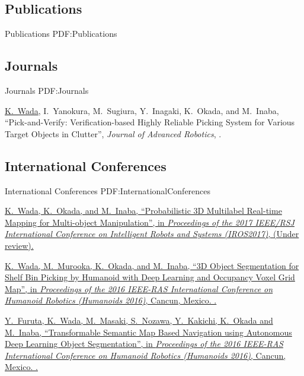\documentclass[letterpaper,MMMyyyy,nonstop]{simpleresumecv}
\begin{document}
\begin{body}

\section
{Publications}
{Publications}
{PDF:Publications}

\subsection
{Journals}
{Journals}
{PDF:Journals}

\GapNoBreak
\NumberedItem{{\CharSpace}[7]}
{\underline{K.~Wada}, I.~Yanokura, M.~Sugiura, Y.~Inagaki, K.~Okada, and M.~Inaba,
``Pick-and-Verify: Verification-based Highly Reliable Picking System for Various Target Objects in Clutter'',
\textit{Journal of Advanced Robotics},
.}

\BigGap
\subsection
{International Conferences}
{International Conferences}
{PDF:InternationalConferences}

\GapNoBreak
\NumberedItem{{\CharSpace}[8]}
\href{http://www.iros2017.org/}
{\underline{K.~Wada}, K.~Okada, and M.~Inaba,
``Probabilistic 3D Multilabel Real-time Mapping for Multi-object Manipulation'',
in \textit{Proceedings of the 2017 IEEE/RSJ International Conference on Intelligent Robots and Systems (IROS2017)},
(Under review).}

\GapNoBreak
\NumberedItem{{\CharSpace}[6]}
\href{https://ras.papercept.net/conferences/conferences/ICHR16/program/ICHR16_ContentListWeb_2.html}
{\underline{K.~Wada}, M.~Murooka, K.~Okada, and M.~Inaba,
``3D Object Segmentation for Shelf Bin Picking by Humanoid with Deep Learning and Occupancy Voxel Grid Map'',
in \textit{Proceedings of the 2016 IEEE-RAS International Conference on Humanoid Robotics (Humanoids 2016)},
Cancun, Mexico.
.}

\GapNoBreak
\NumberedItem{{\CharSpace}[5]}
\href{https://ras.papercept.net/conferences/conferences/ICHR16/program/ICHR16_ContentListWeb_1.html}
{Y.~Furuta, \underline{K.~Wada}, M.~Masaki, S.~Nozawa, Y.~Kakichi, K.~Okada and M.~Inaba,
``Transformable Semantic Map Based Navigation using Autonomous Deep Learning Object Segmentation'',
in \textit{Proceedings of the 2016 IEEE-RAS International Conference on Humanoid Robotics (Humanoids 2016)},
Cancun, Mexico.
.}


\end{body}
\end{document}
